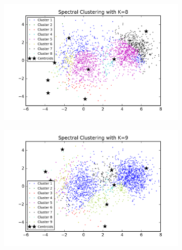 \begin{figure}[htb]
\begin{subfigure}[b]{0.475\textwidth}
        \end{subfigure}
        \hfill
        \begin{subfigure}[b]{0.475\textwidth}  
            \centering 
            \includegraphics[width=\textwidth]{./figures/clustering_spectral_8.png}
        \end{subfigure}
        \begin{subfigure}[b]{0.475\textwidth}   
            \centering 
            \includegraphics[width=\textwidth]{./figures/clustering_spectral_9.png}
        \end{subfigure}
        \hfill
        \begin{subfigure}[b]{0.475\textwidth}   
            \centering 

\end{subfigure}
\end{figure}

